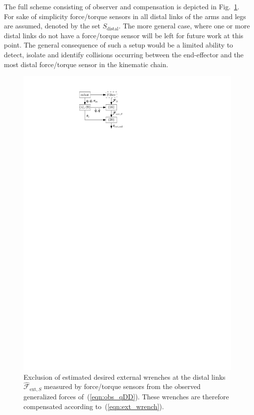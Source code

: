 The full scheme consisting of observer and compensation is depicted in Fig.~\ref{fig:flowchart}.
For sake of simplicity force/torque sensors in all distal links of the arms and legs are assumed, denoted by the set $S_\mathrm{distal}$.
The more general case, where one or more distal links do not have a force/torque sensor will be left for future work at this point.
The general consequence of such a setup would be a limited ability to detect, isolate and identify collisions occurring between the end-effector and the most distal force/torque sensor in the kinematic chain.
%
\begin{figure}
\begin{center}
\includegraphics{figures/flowchart_compensation}
\end{center}
\caption{Exclusion of estimated desired external wrenches at the distal links $\hat{\bm{\mathcal{F}}}_{\mathrm{ext},S}$ measured by force/torque sensors from the observed generalized  forces of~(\ref{eqn:obs_qDD}).
These wrenches are therefore compensated according to~(\ref{eqn:ext_wrench}).}\vspace*{-0.8cm}
\label{fig:flowchart}
\end{figure}
